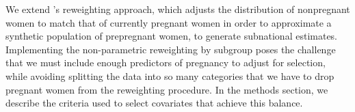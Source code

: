 We extend \cite{coffey2015prepregnancy}’s reweighting approach, which adjusts the distribution of nonpregnant women to match that of currently pregnant women in order to approximate a synthetic population of prepregnant women, to generate subnational estimates. Implementing the non-parametric reweighting by subgroup poses the challenge that we must include enough predictors of pregnancy to adjust for selection, while avoiding splitting the data into so many categories that we have to drop pregnant women from the reweighting procedure. In the methods section, we describe the criteria used to select covariates that achieve this balance.